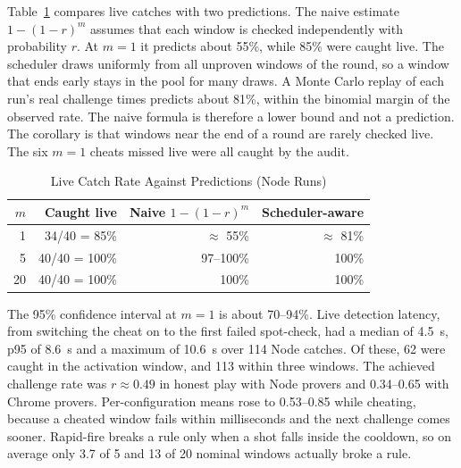 \documentclass[conference]{IEEEtran}
\begin{document}
Table~\ref{tab:detection} compares live catches with two predictions. %
The naive estimate $1-(1-r)^m$ assumes that each window is checked independently with probability $r$. %
At $m=1$ it predicts about 55\%, while 85\% were caught live. %
The scheduler draws uniformly from all unproven windows of the round, so a window that ends early stays in the pool for many draws.
A Monte Carlo replay of each run's real challenge times predicts about 81\%, within the binomial margin of the observed rate. %
The naive formula is therefore a lower bound and not a prediction.
The corollary is that windows near the end of a round are rarely checked live.
The six $m=1$ cheats missed live were all caught by the audit. %

\begin{table}[t]
\centering
\caption{Live Catch Rate Against Predictions (Node Runs)}
\label{tab:detection}
\begin{tabular}{@{}rrrr@{}}
\toprule
$m$ & Caught live & Naive $1-(1-r)^m$ & Scheduler-aware \\ %
\midrule
1 & 34/40 = 85\% & $\approx$ 55\% & $\approx$ 81\% \\ %
5 & 40/40 = 100\% & 97--100\% & 100\% \\ %
20 & 40/40 = 100\% & 100\% & 100\% \\ %
\bottomrule
\end{tabular}
\end{table}

The 95\% confidence interval at $m=1$ is about 70--94\%. %
Live detection latency, from switching the cheat on to the first failed spot-check, had a median of 4.5~s, p95 of 8.6~s and a maximum of 10.6~s over 114 Node catches. %
Of these, 62 were caught in the activation window, and 113 within three windows. %
The achieved challenge rate was $r \approx 0.49$ in honest play with Node provers and 0.34--0.65 with Chrome provers. %
Per-configuration means rose to 0.53--0.85 while cheating, because a cheated window fails within milliseconds and the next challenge comes sooner. %
Rapid-fire breaks a rule only when a shot falls inside the cooldown, so on average only 3.7 of 5 and 13 of 20 nominal windows actually broke a rule. %
\end{document}
